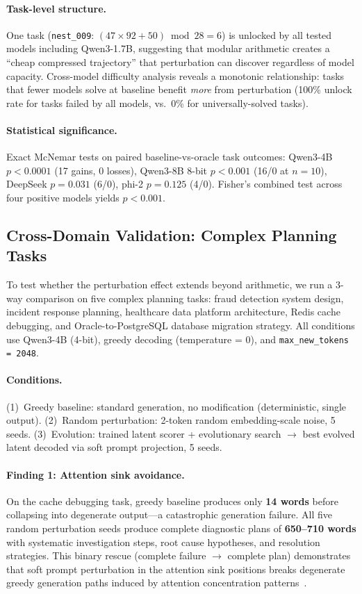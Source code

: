\documentclass{article}
\begin{document}
\paragraph{Task-level structure.} One task (\texttt{nest\_009}:
$(47 \times 92 + 50) \bmod 28 = 6$) is unlocked by all tested models
including Qwen3-1.7B, suggesting that modular arithmetic creates a
``cheap compressed trajectory'' that perturbation can discover
regardless of model capacity. Cross-model difficulty analysis reveals a
monotonic relationship: tasks that fewer models solve at baseline benefit
\emph{more} from perturbation (100\% unlock rate for tasks failed by
all models, vs.\ 0\% for universally-solved tasks).

\paragraph{Statistical significance.} Exact McNemar tests on paired
baseline-vs-oracle task outcomes: Qwen3-4B $p < 0.0001$ (17 gains, 0
losses), Qwen3-8B 8-bit $p < 0.001$ (16/0 at $n{=}10$),
DeepSeek $p = 0.031$ (6/0), phi-2 $p = 0.125$ (4/0).
Fisher's combined test across four positive models yields $p < 0.001$.

\subsection{Cross-Domain Validation: Complex Planning Tasks}
\label{sec:planning}

To test whether the perturbation effect extends beyond arithmetic, we
run a 3-way comparison on five complex planning tasks: fraud detection
system design, incident response planning, healthcare data platform
architecture, Redis cache debugging, and Oracle-to-PostgreSQL database
migration strategy. All conditions use Qwen3-4B (4-bit), greedy decoding
(temperature = 0), and \texttt{max\_new\_tokens = 2048}.

\paragraph{Conditions.}
(1)~Greedy baseline: standard generation, no modification (deterministic,
single output).
(2)~Random perturbation: 2-token random embedding-scale noise, 5 seeds.
(3)~Evolution: trained latent scorer + evolutionary search $\to$ best
evolved latent decoded via soft prompt projection, 5 seeds.

\paragraph{Finding 1: Attention sink avoidance.}
On the cache debugging task, greedy baseline produces only \textbf{14 words}
before collapsing into degenerate output---a catastrophic generation failure.
All five random perturbation seeds produce complete diagnostic plans of
\textbf{650--710 words} with systematic investigation steps, root cause
hypotheses, and resolution strategies. This binary rescue (complete failure
$\to$ complete plan) demonstrates that soft prompt perturbation in the
attention sink positions breaks degenerate greedy generation paths induced
by attention concentration patterns~\cite{xiao2024}.
\end{document}
